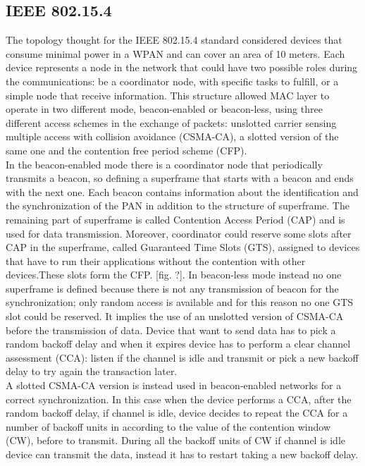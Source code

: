 \documentclass[conference]{IEEEtran}
\begin{document}
\subsection{IEEE 802.15.4}
The topology thought for the IEEE 802.15.4 standard considered devices that consume minimal power in a WPAN and can cover an area of 10 meters. Each device represents a node in the network that could have two possible roles during the communications: be a coordinator node, with specific tasks to fulfill, or a simple node that receive information. This structure allowed MAC layer to operate in two different mode, beacon-enabled or beacon-less, using three different access schemes in the exchange of packets: unslotted carrier sensing multiple access with collision avoidance (CSMA-CA), a slotted version of the same one and the contention free period scheme (CFP).
\\In the beacon-enabled mode there is a coordinator node that periodically transmits a beacon, so defining a superframe that starts with a beacon and ends with the next one. Each beacon contains information about the identification and the synchronization of the PAN in addition to the structure of superframe. The remaining part of superframe is called Contention Access Period (CAP) and is used for data transmission. Moreover, coordinator could reserve some slots after CAP in the superframe, called Guaranteed Time Slots (GTS), assigned to devices that have to run their applications without the contention with other devices.These slots form the CFP. [fig. ?].
In beacon-less mode instead no one superframe is defined because there is not any transmission of beacon for the synchronization; only random access is available and for this reason no one GTS slot could be reserved. It implies the use of an unslotted version of CSMA-CA before the transmission of data. Device that want to send data has to pick a random backoff delay and when it expires device has to perform a clear channel assessment (CCA): listen if the channel is idle and transmit or pick a new backoff delay to try again the transaction later. 
\\A slotted CSMA-CA version is instead used in beacon-enabled networks for a correct synchronization. In this case when the device performs a CCA, after the random backoff delay, if channel is idle, device decides to repeat the CCA for a number of backoff units in according to the value of the contention window (CW), before to transmit. During all the backoff units of CW if channel is idle device can transmit the data, instead it has to restart taking a new backoff delay. 
\end{document}
